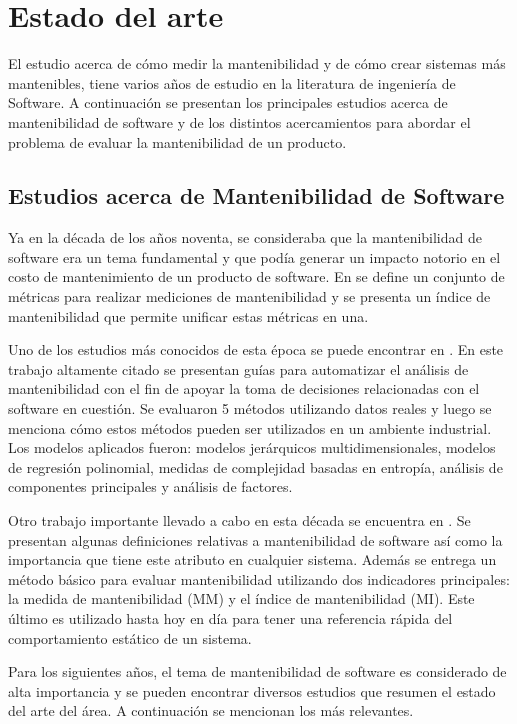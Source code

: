 \chapter{Estado del arte}
\label{chap:arte}

El estudio acerca de cómo medir la mantenibilidad y de cómo crear sistemas
más mantenibles, tiene varios años de estudio en la literatura de ingeniería de Software.
A continuación se presentan los principales estudios acerca de mantenibilidad
de software y de los distintos acercamientos para abordar el problema
de evaluar la mantenibilidad de un producto.

\section{Estudios acerca de Mantenibilidad de Software}

Ya en la década de los años noventa, se consideraba que la mantenibilidad
de software era un tema fundamental y que podía generar un impacto notorio
en el costo de mantenimiento de un producto de software. En \cite{Oman:1992}
se define un conjunto de métricas para realizar mediciones de mantenibilidad y se
presenta un índice de mantenibilidad que permite unificar estas métricas en
una.

Uno de los estudios más conocidos de esta época se puede encontrar en \cite{Coleman:1994}.
En este trabajo altamente citado se presentan guías  para automatizar el análisis de
mantenibilidad con el fin de apoyar la toma de decisiones relacionadas con el
software en cuestión. Se evaluaron 5 métodos utilizando datos reales y luego
se menciona cómo estos métodos pueden ser utilizados en un ambiente industrial.
Los modelos aplicados fueron: modelos jerárquicos multidimensionales, modelos
de regresión polinomial, medidas de complejidad basadas en entropía, análisis
de componentes principales y análisis de factores.

Otro trabajo importante llevado a cabo en esta década se
encuentra en \cite{West:1996}. Se presentan algunas definiciones
relativas a mantenibilidad de software así como la importancia que tiene
este atributo en cualquier sistema. Además se entrega un método básico
para evaluar mantenibilidad utilizando dos indicadores principales: la
medida de mantenibilidad (MM) y el índice de mantenibilidad (MI). Este último
es utilizado hasta hoy en día para tener una referencia rápida del comportamiento
estático de un sistema. 

Para los siguientes años, el tema de mantenibilidad de software es considerado
de alta importancia y se pueden encontrar diversos estudios que resumen
el estado del arte del área. A continuación se mencionan los más relevantes.

